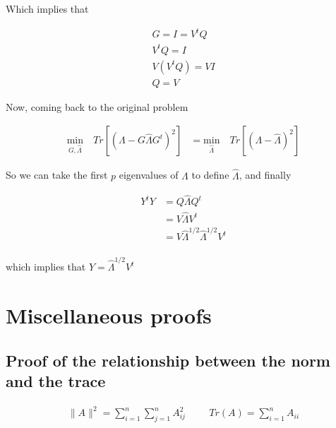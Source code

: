 \documentclass[12pt,journal]{IEEEtran}
\begin{document}
    Which implies that

    \begin{equation*}
        \begin{aligned}
        G = I = V^tQ\\
        V^tQ = I\\
        V(V^tQ) = VI\\
        Q = V
        \end{aligned}
    \end{equation*}

    Now, coming back to the original problem

    \begin{equation*}
        \begin{aligned}
            \underset{G,\hat{\Lambda}}{\text{min}} \quad Tr[(\Lambda - G \hat{\Lambda} G^t)^2]
            &=
            \underset{\hat{\Lambda}}{\text{min}} \quad Tr[(\Lambda - \hat{\Lambda})^2]
        \end{aligned}
    \end{equation*}

    So we can take the first $p$ eigenvalues of $\Lambda$ to define $\hat{\Lambda}$,
    and finally

    \begin{equation*}
        \begin{aligned}
            Y^tY &= Q \hat{\Lambda} Q^t\\
            &=
            V \hat{\Lambda} V^t\\
            &=
            V \hat{\Lambda}^{1/2} \hat{\Lambda}^{1/2} V^t\\
        \end{aligned}
    \end{equation*}

    which implies that $Y = \hat{\Lambda}^{1/2} V^t$

    \section{Miscellaneous proofs}

    \subsection{Proof of the relationship between the norm and the trace} \label{norm_trace}

    \begin{equation*}
        \begin{aligned}
            \lVert A \rVert^2 = \sum_{i=1}^n \sum_{j=1}^n A_{ij}^2
            \hspace{1cm}
            Tr(A) = \sum_{i=1}^n A_{ii}
        \end{aligned}
    \end{equation*}\\
\end{document}
